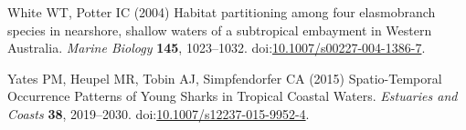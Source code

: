 \documentclass[]{article}
\begin{document}
\leavevmode\hypertarget{ref-white_habitat_2004}{}%
White WT, Potter IC (2004) Habitat partitioning among four elasmobranch
species in nearshore, shallow waters of a subtropical embayment in
Western Australia. \emph{Marine Biology} \textbf{145}, 1023--1032.
doi:\href{https://doi.org/10.1007/s00227-004-1386-7}{10.1007/s00227-004-1386-7}.

\leavevmode\hypertarget{ref-yates_spatio-temporal_2015}{}%
Yates PM, Heupel MR, Tobin AJ, Simpfendorfer CA (2015) Spatio-Temporal
Occurrence Patterns of Young Sharks in Tropical Coastal Waters.
\emph{Estuaries and Coasts} \textbf{38}, 2019--2030.
doi:\href{https://doi.org/10.1007/s12237-015-9952-4}{10.1007/s12237-015-9952-4}.
\end{document}
